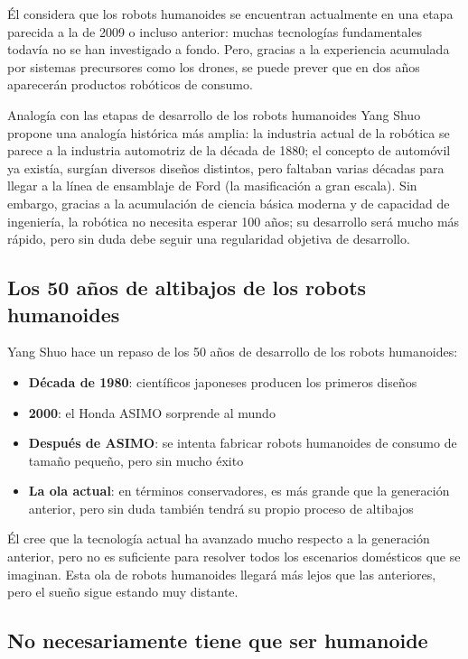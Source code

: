\documentclass[a4paper]{article}
\begin{document}
Él considera que los robots humanoides se encuentran actualmente en una etapa parecida a la de 2009 o incluso anterior: muchas tecnologías fundamentales todavía no se han investigado a fondo. Pero, gracias a la experiencia acumulada por sistemas precursores como los drones, se puede prever que en dos años aparecerán productos robóticos de consumo.

\begin{importantbox}{Analogía con las etapas de desarrollo de los robots humanoides}
Yang Shuo propone una analogía histórica más amplia: la industria actual de la robótica se parece a la industria automotriz de la década de 1880; el concepto de automóvil ya existía, surgían diversos diseños distintos, pero faltaban varias décadas para llegar a la línea de ensamblaje de Ford (la masificación a gran escala). Sin embargo, gracias a la acumulación de ciencia básica moderna y de capacidad de ingeniería, la robótica no necesita esperar 100 años; su desarrollo será mucho más rápido, pero sin duda debe seguir una regularidad objetiva de desarrollo.
\end{importantbox}

\subsection{Los 50 años de altibajos de los robots humanoides}

Yang Shuo hace un repaso de los 50 años de desarrollo de los robots humanoides:
\begin{itemize}
    \item \textbf{Década de 1980}: científicos japoneses producen los primeros diseños
    \item \textbf{2000}: el Honda ASIMO sorprende al mundo
    \item \textbf{Después de ASIMO}: se intenta fabricar robots humanoides de consumo de tamaño pequeño, pero sin mucho éxito
    \item \textbf{La ola actual}: en términos conservadores, es más grande que la generación anterior, pero sin duda también tendrá su propio proceso de altibajos
\end{itemize}

Él cree que la tecnología actual ha avanzado mucho respecto a la generación anterior, pero no es suficiente para resolver todos los escenarios domésticos que se imaginan. Esta ola de robots humanoides llegará más lejos que las anteriores, pero el sueño sigue estando muy distante.

\subsection{No necesariamente tiene que ser humanoide}
\end{document}
